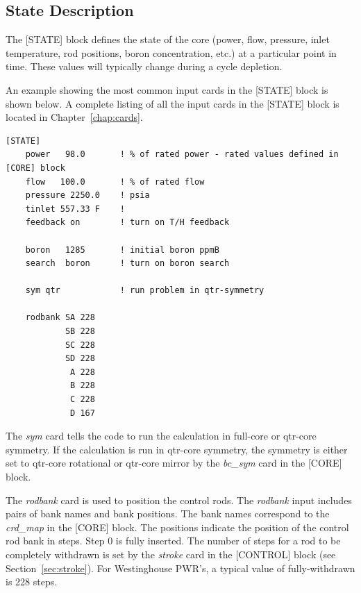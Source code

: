 %
%
\subsection{State Description}

The [STATE] block defines the state of the core
(power, flow, pressure, inlet temperature, rod positions, boron concentration, etc.)
at a particular point in time.
These values will typically change during a cycle depletion.

An example showing the most common input cards in the [STATE] block is shown below.
A complete listing of all the input cards in the [STATE] block is located in Chapter~\ref{chap:cards}.

\begin{Verbatim}[fontsize=\small]
  [STATE]
    power   98.0       ! % of rated power - rated values defined in [CORE] block
    flow   100.0       ! % of rated flow
    pressure 2250.0    ! psia
    tinlet 557.33 F    !
    feedback on        ! turn on T/H feedback

    boron   1285       ! initial boron ppmB
    search  boron      ! turn on boron search

    sym qtr            ! run problem in qtr-symmetry

    rodbank SA 228
            SB 228
            SC 228
            SD 228
             A 228
             B 228
             C 228
             D 167
\end{Verbatim}

The {\it sym} card tells the code to run the calculation in full-core or
qtr-core symmetry. If the calculation is run in qtr-core symmetry, the symmetry is either
set to qtr-core rotational or qtr-core mirror by the {\it bc\_sym} card in the [CORE] block.

The {\it rodbank} card is used to position the control rods. The {\it rodbank} input includes pairs of bank names
and bank positions.  The bank names correspond to the {\it crd\_map} in the [CORE] block.
The positions indicate the position of the control rod bank in steps.
Step 0 is fully inserted.
The number of steps for a rod to be completely withdrawn is set by the {\it stroke} card in
the [CONTROL] block (see Section~\ref{sec:stroke}). For Westinghouse PWR's, a typical value of fully-withdrawn is 228 steps.

